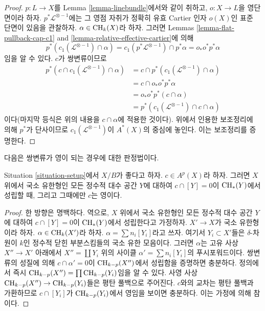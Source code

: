\begin{proof}
$p : L \to X$를 Lemma \ref{lemma-linebundle}에서와 같이 취하고,
$o : X \to L$을 영단면이라 하자.
$p^*\mathcal{L}^{\otimes -1}$에는 그 영점 자취가 정확히
유효 Cartier 인자 $o(X)$인 표준 단면이 있음을 관찰하자.
$\alpha \in \mathop{\mathrm{CH}}\nolimits_k(X)$라 하자. 그러면 Lemmas
\ref{lemma-flat-pullback-cap-c1} and
\ref{lemma-relative-effective-cartier}에 의해
$$
p^*(c_1(\mathcal{L}^{\otimes -1}) \cap \alpha) =
c_1(p^*\mathcal{L}^{\otimes -1}) \cap p^*\alpha =
o_* o^* p^*\alpha
$$
임을 알 수 있다. $c$가 쌍변류이므로
\begin{align*}
p^*(c \cap c_1(\mathcal{L}^{\otimes -1}) \cap \alpha)
& =
c \cap p^*(c_1(\mathcal{L}^{\otimes -1}) \cap \alpha) \\
& =
c \cap o_* o^* p^*\alpha \\
& =
o_* o^* p^*(c \cap \alpha) \\
& =
p^*(c_1(\mathcal{L}^{\otimes -1}) \cap c \cap \alpha)
\end{align*}
이다(마지막 등식은 위의 내용을 $c \cap \alpha$에 적용한 것이다).
위에서 인용한 보조정리에 의해 $p^*$가 단사이므로
$c_1(\mathcal{L}^{\otimes -1})$이 $A^*(X)$의 중심에 놓인다.
이는 보조정리를 증명한다.
\end{proof}

\noindent
다음은 쌍변류가 영이 되는 경우에 대한 판정법이다.

\begin{lemma}
\label{lemma-bivariant-zero}
Situation \ref{situation-setup}에서 $X/B$가 좋다고 하자.
$c \in A^p(X)$라 하자. 그러면 $X$ 위에서 국소 유한형인 모든
정수적 대수 공간 $Y$에 대하여
$c \cap [Y] = 0$이 $\mathop{\mathrm{CH}}\nolimits_*(Y)$에서 성립할 때, 그리고 그때에만
$c$는 영이다.
\end{lemma}

\begin{proof}
한 방향은 명백하다. 역으로, $X$ 위에서 국소 유한형인 모든 정수적
대수 공간 $Y$에 대하여 $c \cap [Y] = 0$이 $\mathop{\mathrm{CH}}\nolimits_*(Y)$에서
성립한다고 가정하자.
$X' \to X$가 국소 유한형이라 하자. $\alpha \in \mathop{\mathrm{CH}}\nolimits_k(X')$라 하자.
$\alpha = \sum n_i [Y_i]$라고 쓰자. 여기서
$Y_i \subset X'$들은 $\delta$-차원이 $k$인 정수적 닫힌
부분스킴들의 국소 유한 모음이다.
그러면 $\alpha$는 고유 사상 $X'' \to X'$ 아래에서
$X'' = \coprod Y_i$ 위의 사이클
$\alpha' = \sum n_i[Y_i]$의 푸시포워드이다.
쌍변류의 성질에 의해
$c \cap \alpha' = 0$이 $\mathop{\mathrm{CH}}\nolimits_{k - p}(X'')$에서 성립함을
증명하면 충분하다. 정의에서 즉시
$\mathop{\mathrm{CH}}\nolimits_{k - p}(X'') = \prod \mathop{\mathrm{CH}}\nolimits_{k - p}(Y_i)$임을 알 수 있다.
사영 사상 $\mathop{\mathrm{CH}}\nolimits_{k - p}(X'') \to \mathop{\mathrm{CH}}\nolimits_{k - p}(Y_i)$들은
평탄 풀백으로 주어진다. $c$와의 교차는 평탄 풀백과 가환하므로
$c \cap [Y_i]$가 $\mathop{\mathrm{CH}}\nolimits_{k - p}(Y_i)$에서 영임을 보이면 충분하다.
이는 가정에 의해 참이다.
\end{proof}

